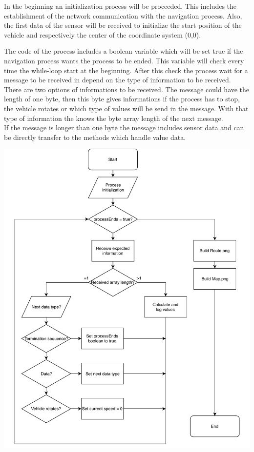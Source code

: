 In the beginning an initialization process will be proceeded. This includes the establishment of the network communication with the navigation process. Also, the first data of the sensor will be received to initialize the start position of the vehicle and respectively the center of the coordinate system (0,0).\\


\begin{minipage}{0.4\textwidth}
The code of the process includes a boolean variable which will be set true if the navigation process wants the process to be ended. This variable will check every time the while-loop start at the beginning. After this check the process wait for a message to be received in depend on the type of information to be received.\\
There are two options of informations to be received. The message could have the length of one byte, then this byte gives informations if the process has to stop, the vehicle rotates or which type of values will be send in the message. With that type of information the knows the byte array length of the next message. \\
If the message is longer than one byte the message includes sensor data and can be directly transfer to the methods which handle value data.\\
\end{minipage}
\begin{minipage}{0.6\textwidth}
\label{programSequence}
\begin{center}
	\includegraphics[scale=0.6]{sources/mapping/program_sequence.pdf}
\end{center}
\end{minipage}

